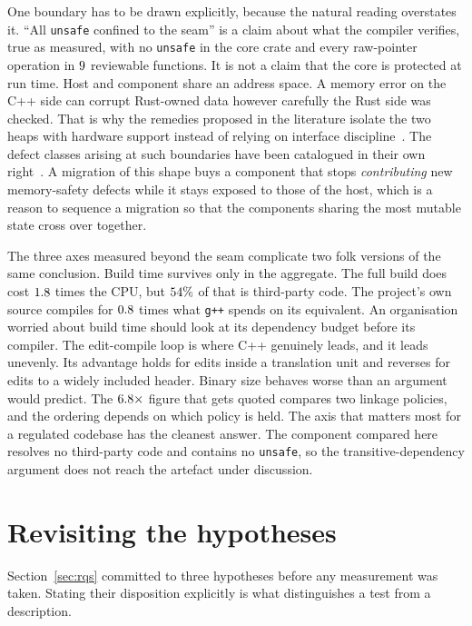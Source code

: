 \documentclass[english,oneside,a4paper,censored,csm,software-track-2020]{HYthesisML}
\begin{document}
One boundary has to be drawn explicitly, because the natural reading overstates it. ``All
\texttt{unsafe} confined to the seam'' is a claim about what the compiler verifies, true as
measured, with no \texttt{unsafe} in the core crate and every raw-pointer operation in
$9$ reviewable functions. It is not a claim that the core is protected at run time.
Host and component share an address space. A memory error on the C++ side can corrupt
Rust-owned data however carefully the Rust side was checked. That is why the remedies proposed in
the literature isolate the two heaps with hardware support instead of relying on interface
discipline~\cite{rivera2021galeed,kirth2022pkrusafe}. The defect classes arising at such boundaries
have been catalogued in their own right~\cite{li2022crosslang}. A migration of this
shape buys a component that stops \emph{contributing} new memory-safety defects while it stays
exposed to those of the host, which is a reason to sequence a migration so that the components
sharing the most mutable state cross over together.

The three axes measured beyond the seam complicate two folk versions of the same conclusion.
Build time survives only in the aggregate. The full build does cost $1.8$ times
the CPU, but $54\%$ of that is third-party code. The project's own source compiles
for $0.8$ times what \texttt{g++} spends on its equivalent. An
organisation worried about build time should look at its dependency budget before its compiler.
The edit-compile loop is where C++ genuinely leads, and it leads unevenly. Its advantage holds
for edits inside a translation unit and reverses for edits to a widely included header. Binary
size behaves worse than an argument would predict. The $6.8\times$ figure that
gets quoted compares two linkage policies, and the ordering depends on which policy is held. The
axis that matters most for a regulated codebase has the cleanest answer. The component compared
here resolves no third-party code and contains no \texttt{unsafe}, so the transitive-dependency
argument does not reach the artefact under discussion.

\section{Revisiting the hypotheses}\label{sec:hypotheses}
Section~\ref{sec:rqs} committed to three hypotheses before any measurement was taken. Stating
their disposition explicitly is what distinguishes a test from a description.
\end{document}
